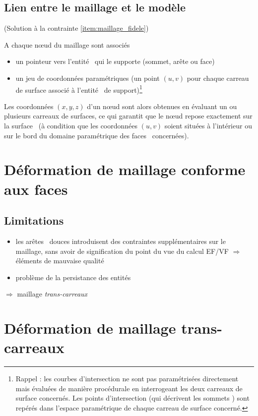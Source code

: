 \subsection{Lien entre le maillage et le modèle \brep}
(Solution à la contrainte \ref{item:maillage_fidele})\par
A chaque n\oe ud du maillage sont associés
\begin{itemize}
	\item un pointeur vers l'entité \brep\ qui le supporte (sommet, arête ou face)
	\item un jeu de coordonnées paramétriques (\ie un point $(u,v)$ pour chaque carreau de surface associé à l'entité \brep\ de support)\footnote{Rappel : les courbes d'intersection ne sont pas paramétrisées directement mais évaluées de manière procédurale en interrogeant les deux carreaux de surface concernés. Les points d'intersection (qui décrivent les sommets \brep) sont repérés dans l'espace paramétrique de chaque carreau de surface concerné.}
\end{itemize}
Les coordonnées $(x,y,z)$ d'un n\oe ud sont alors obtenues en évaluant un ou plusieurs carreaux de surfaces, ce qui garantit que le n\oe ud repose exactement sur la surface \brep\ (à condition que les coordonnées $(u,v)$ soient situées à l'intérieur ou sur le bord du domaine paramétrique des faces \brep\ concernées).


\section{Déformation de maillage conforme aux faces \brep}
\subsection{Limitations}
\begin{itemize}
	\item les arêtes \brep\ douces introduisent des contraintes supplémentaires sur le maillage, sans avoir de signification du point du vue du calcul EF/VF $\Rightarrow$ éléments de mauvaise qualité
	\item problème de la persistance des entités \brep
\end{itemize}
$\Rightarrow$ maillage \textit{trans-carreaux}


\section{Déformation de maillage trans-carreaux}

